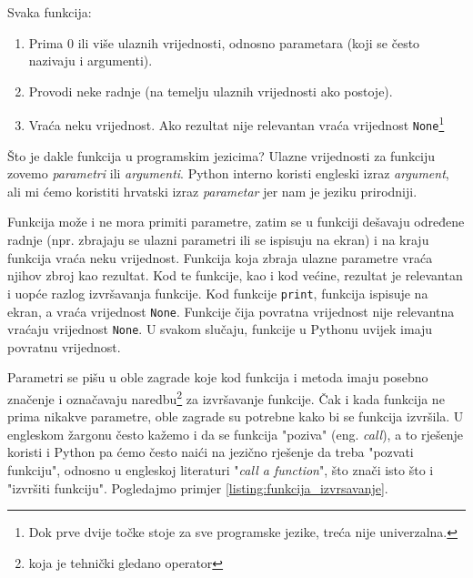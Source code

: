 Svaka funkcija:

\begin{enumerate}
\item Prima 0 ili više ulaznih vrijednosti, odnosno parametara (koji se često nazivaju i argumenti).
\item Provodi neke radnje (na temelju ulaznih vrijednosti ako postoje).
\item Vraća neku vrijednost. Ako rezultat nije relevantan vraća vrijednost \texttt{None}\footnote{Dok prve dvije točke stoje za sve programske jezike, treća nije univerzalna.}
\end{enumerate}

Što je dakle funkcija u programskim jezicima? Ulazne vrijednosti za funkciju zovemo \textit{parametri} ili \textit{argumenti}. Python interno koristi engleski izraz \textit{argument}, ali mi ćemo koristiti hrvatski izraz \textit{parametar} jer nam je jeziku prirodniji.

Funkcija može i ne mora primiti parametre, zatim se u funkciji dešavaju određene radnje (npr. zbrajaju se ulazni parametri ili se ispisuju na ekran) i na kraju funkcija vraća neku vrijednost. Funkcija koja zbraja ulazne parametre vraća njihov zbroj kao rezultat. Kod te funkcije, kao i kod većine, rezultat je relevantan i uopće razlog izvršavanja funkcije. Kod funkcije \texttt{print}, funkcija ispisuje na ekran, a vraća vrijednost \texttt{None}. Funkcije čija povratna vrijednost nije relevantna vraćaju vrijednost \texttt{None}. U svakom slučaju, funkcije u Pythonu uvijek imaju povratnu vrijednost.


Parametri se pišu u oble zagrade koje kod funkcija i metoda imaju posebno značenje i označavaju naredbu\footnote{koja je tehnički gledano operator} za izvršavanje funkcije. Čak i kada funkcija ne prima nikakve parametre, oble zagrade su potrebne kako bi se funkcija izvršila. U engleskom žargonu često kažemo i da se funkcija "poziva" (eng. \textit{call}), a to rješenje koristi i Python pa ćemo često naići na jezično rješenje da treba "pozvati funkciju", odnosno u engleskoj literaturi "\textit{call a function}", što znači isto što i "izvršiti funkciju". Pogledajmo primjer \ref{listing:funkcija_izvrsavanje}.



